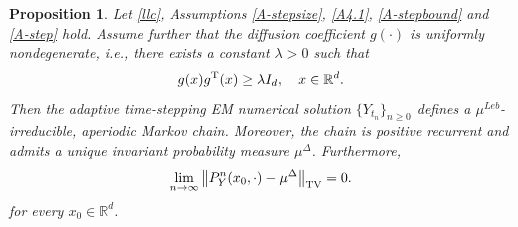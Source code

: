 \documentclass[preprint,12pt,compress]{elsarticle}
\newtheorem{proposition}[theorem]{Proposition}
\begin{document}
\begin{proposition} \label{th-a2} 
Let \eqref{llc}, Assumptions \ref{A-stepsize}, \ref{A4.1}, \ref{A-stepbound} and \ref{A-step} hold. Assume further that the diffusion coefficient $g(\cdot)$ is uniformly nondegenerate, i.e., there exists a constant $\lambda > 0$ such that
\begin{equation*}
	g(x)g^{\rm T}(x) \ge \lambda I_{d}, \quad x \in \mathbb{R}^{d}.
\end{equation*}
Then the adaptive time-stepping EM numerical solution ${\{ {Y_{{t_n}}}\}  _{n \ge 0}}$ defines a $\mu^{Leb}$-irreducible, aperiodic Markov chain. Moreover, the chain is positive recurrent and admits a unique invariant probability measure $\mu^\Delta$. Furthermore,
\begin{equation*}
	\mathop {\lim }\limits_{n \to \infty }{\left\| {{P_Y^n}(x_0, \cdot ) - \mu^\Delta} \right\|_{{\rm TV}}} = 0.
\end{equation*}
for every $x_0 \in \mathbb{R}^d$.
\end{proposition}
\end{document}
